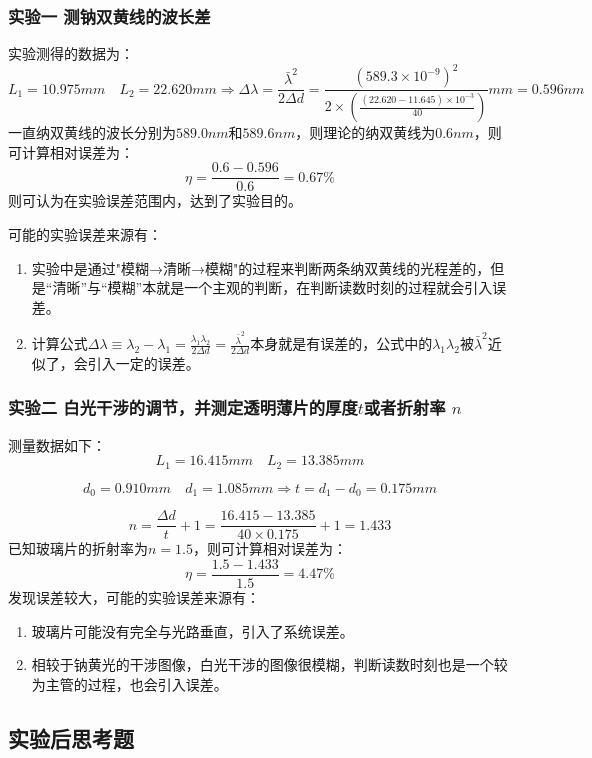 \documentclass[dvipsnames, svgnames,a4paper,11pt]{article}
\begin{document}
	\subsubsection{实验一 测钠双黄线的波长差}
		实验测得的数据为：
		\[ 
		L_1=10.975mm \quad L_2=22.620mm \Longrightarrow \Delta\lambda=\frac{\bar{\lambda}^2}{2\Delta d}=\frac{(589.3\times10^{-9})^2}{2\times(\frac{(22.620-11.645)\times10^{-3}}{40})}mm=0.596nm
		 \]
		一直纳双黄线的波长分别为$589.0nm$和$589.6nm$，则理论的纳双黄线为$0.6nm$，则可计算相对误差为：
		\[
		\eta=\frac{0.6-0.596}{0.6}=0.67 \%
		\]
		则可认为在实验误差范围内，达到了实验目的。
		
		可能的实验误差来源有：
		\begin{enumerate}
			\item 实验中是通过"模糊→清晰→模糊"的过程来判断两条纳双黄线的光程差的，但是“清晰”与“模糊”本就是一个主观的判断，在判断读数时刻的过程就会引入误差。
			\item 计算公式$ \Delta \lambda\equiv\lambda_2-\lambda_1=\frac{\lambda_1\lambda_2}{2\Delta d}=\frac{\bar{\lambda}^2}{2\Delta d} 
			$本身就是有误差的，公式中的$\lambda_1\lambda_2$被$\bar{\lambda}^2$近似了，会引入一定的误差。
		\end{enumerate}
		
	\subsubsection{实验二 白光干涉的调节，并测定透明薄片的厚度$t$或者折射率 $n$}
		测量数据如下：
		\[ 
		L_1=16.415mm \quad L_2=13.385mm
		\]

		\[ 
		d_0=0.910mm \quad d_1=1.085mm\Longrightarrow t=d_1-d_0=0.175mm
		\]

		\[ 
		n=\frac{\Delta d}{t}+1=\frac{16.415-13.385}{40\times0.175}+1=1.433
		\]
		已知玻璃片的折射率为$n=1.5$，则可计算相对误差为：
		\[
		\eta=\frac{1.5-1.433}{1.5}=4.47\%
		\]
		发现误差较大，可能的实验误差来源有：
		\begin{enumerate}
			\item 玻璃片可能没有完全与光路垂直，引入了系统误差。
			\item 相较于钠黄光的干涉图像，白光干涉的图像很模糊，判断读数时刻也是一个较为主管的过程，也会引入误差。
			
		\end{enumerate}
			
			
\subsection{实验后思考题}
\end{document}
